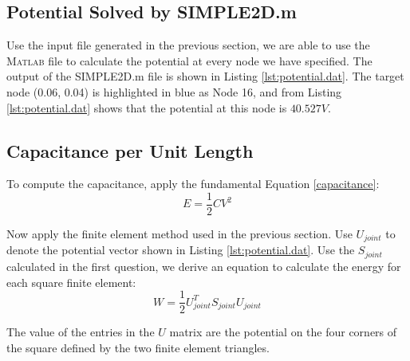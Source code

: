 \documentclass[a4paper,titlepage]{article}
\newcommand{\MATLAB}{\textsc{Matlab}\xspace}
\begin{document}
		\subsection{Potential Solved by SIMPLE2D.m}
			Use the input file generated in the previous section, we are able to use the \MATLAB file to calculate the potential at every node we have specified. The output of the SIMPLE2D.m file is shown in Listing \ref{lst:potential.dat}. The target node (0.06, 0.04) is highlighted in blue as Node 16, and from Listing \ref{lst:potential.dat} shows that the potential at this node is $40.527V$.
			
		\subsection{Capacitance per Unit Length}
			To compute the capacitance, apply the fundamental Equation \ref{capacitance}: 
			\begin{equation}
				E = \frac{1}{2} CV^2
				\label{capacitance}
			\end{equation}
			
			Now apply the finite element method used in the previous section. Use $U_{joint}$ to denote the potential vector shown in Listing \ref{lst:potential.dat}. Use the $S_{joint}$ calculated in the first question, we derive an equation to calculate the energy for each square finite element:
			\begin{equation}
				W = \frac{1}{2}U^T_{joint}S_{joint}U_{joint}
				\label{USU}
			\end{equation}
			
			The value of the entries in the $U$ matrix are the potential on the four corners of the square defined by the two finite element triangles.
			
\end{document}
